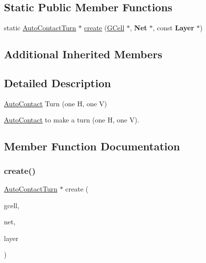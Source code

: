 \subsection*{Static Public Member Functions}
\begin{DoxyCompactItemize}
\item 
static \mbox{\hyperlink{classKatabatic_1_1AutoContactTurn}{Auto\+Contact\+Turn}} $\ast$ \mbox{\hyperlink{classKatabatic_1_1AutoContactTurn_a9d4adb00ccea486f5478bb24e171bdb3}{create}} (\mbox{\hyperlink{classKatabatic_1_1GCell}{G\+Cell}} $\ast$, \textbf{ Net} $\ast$, const \textbf{ Layer} $\ast$)
\end{DoxyCompactItemize}
\subsection*{Additional Inherited Members}


\subsection{Detailed Description}
\mbox{\hyperlink{classKatabatic_1_1AutoContact}{Auto\+Contact}} Turn (one H, one V) 

\mbox{\hyperlink{classKatabatic_1_1AutoContact}{Auto\+Contact}} to make a turn (one H, one V). 

\subsection{Member Function Documentation}
\mbox{\label{classKatabatic_1_1AutoContactTurn_a9d4adb00ccea486f5478bb24e171bdb3}} 
\subsubsection{\texorpdfstring{create()}{create()}}
{\footnotesize\ttfamily \mbox{\hyperlink{classKatabatic_1_1AutoContactTurn}{Auto\+Contact\+Turn}} $\ast$ create (\begin{DoxyParamCaption}\item[{\mbox{\hyperlink{classKatabatic_1_1GCell}{G\+Cell}} $\ast$}]{gcell,  }\item[{\textbf{ Net} $\ast$}]{net,  }\item[{const \textbf{ Layer} $\ast$}]{layer }\end{DoxyParamCaption})\hspace{0.3cm}{\ttfamily [static]}}


